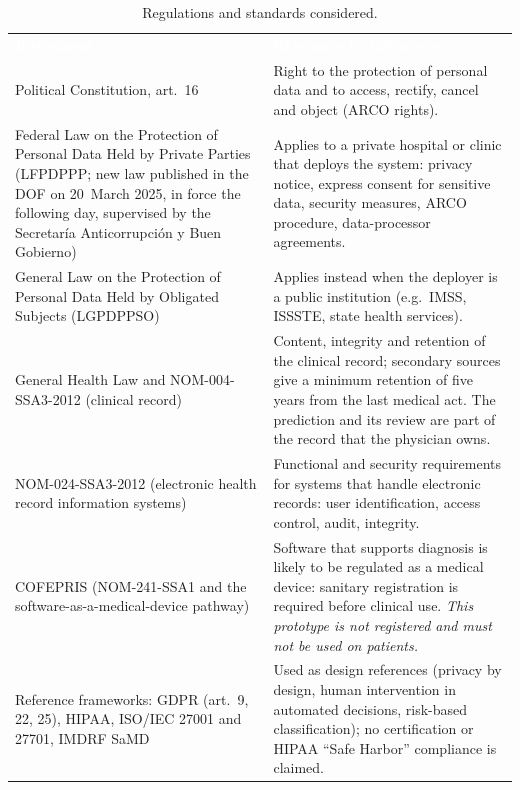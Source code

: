 \documentclass[12pt,a4paper]{article}
\newcommand{\hd}[1]{\textcolor{white}{\textbf{#1}}}
\begin{document}
\begin{table}[H]
\centering
\caption{Regulations and standards considered.}
\label{tab:law}
\renewcommand{\arraystretch}{1.25}
\begin{tabularx}{\textwidth}{L{4.0cm} Y}
\hd{Instrument} & \hd{Relevance to this project} \\
Political Constitution, art.~16 & Right to the protection of personal data and to access, rectify, cancel and object (ARCO rights). \\
Federal Law on the Protection of Personal Data Held by Private Parties (LFPDPPP; new law published in the DOF on 20~March 2025, in force the following day, supervised by the Secretar\'ia Anticorrupci\'on y Buen Gobierno) & Applies to a private hospital or clinic that deploys the system: privacy notice, express consent for sensitive data, security measures, ARCO procedure, data-processor agreements. \\
General Law on the Protection of Personal Data Held by Obligated Subjects (LGPDPPSO) & Applies instead when the deployer is a public institution (e.g.\ IMSS, ISSSTE, state health services). \\
General Health Law and NOM-004-SSA3-2012 (clinical record) & Content, integrity and retention of the clinical record; secondary sources give a minimum retention of five years from the last medical act. The prediction and its review are part of the record that the physician owns. \\
NOM-024-SSA3-2012 (electronic health record information systems) & Functional and security requirements for systems that handle electronic records: user identification, access control, audit, integrity. \\
COFEPRIS (NOM-241-SSA1 and the software-as-a-medical-device pathway) & Software that supports diagnosis is likely to be regulated as a medical device: sanitary registration is required before clinical use. \emph{This prototype is not registered and must not be used on patients.} \\
Reference frameworks: GDPR (art.~9, 22, 25), HIPAA, ISO/IEC 27001 and 27701, IMDRF SaMD & Used as design references (privacy by design, human intervention in automated decisions, risk-based classification); no certification or HIPAA ``Safe Harbor'' compliance is claimed. \\
\end{tabularx}
\end{table}
\end{document}
